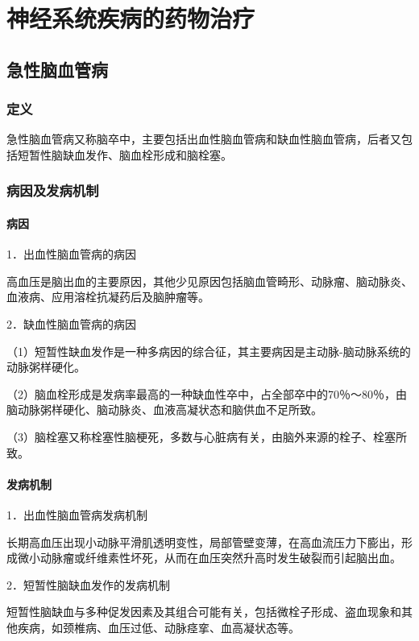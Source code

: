 \chapter{神经系统疾病的药物治疗}

\section{急性脑血管病}

\subsection{定义}

急性脑血管病又称脑卒中，主要包括出血性脑血管病和缺血性脑血管病，后者又包括短暂性脑缺血发作、脑血栓形成和脑栓塞。

\subsection{病因及发病机制}

\subsubsection{病因}

1．出血性脑血管病的病因

高血压是脑出血的主要原因，其他少见原因包括脑血管畸形、动脉瘤、脑动脉炎、血液病、应用溶栓抗凝药后及脑肿瘤等。

2．缺血性脑血管病的病因

（1）短暂性缺血发作是一种多病因的综合征，其主要病因是主动脉-脑动脉系统的动脉粥样硬化。

（2）脑血栓形成是发病率最高的一种缺血性卒中，占全部卒中的70％～80％，由脑动脉粥样硬化、脑动脉炎、血液高凝状态和脑供血不足所致。

（3）脑栓塞又称栓塞性脑梗死，多数与心脏病有关，由脑外来源的栓子、栓塞所致。

\subsubsection{发病机制}

1．出血性脑血管病发病机制

长期高血压出现小动脉平滑肌透明变性，局部管壁变薄，在高血流压力下膨出，形成微小动脉瘤或纤维素性坏死，从而在血压突然升高时发生破裂而引起脑出血。

2．短暂性脑缺血发作的发病机制

短暂性脑缺血与多种促发因素及其组合可能有关，包括微栓子形成、盗血现象和其他疾病，如颈椎病、血压过低、动脉痉挛、血高凝状态等。

